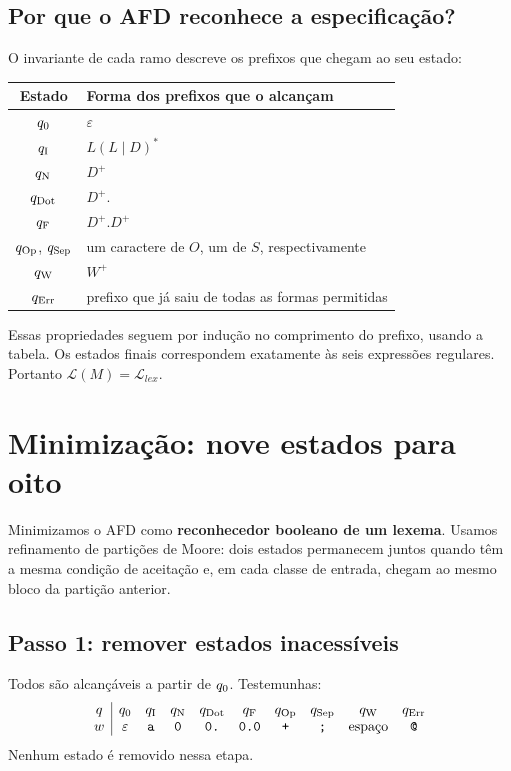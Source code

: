 \documentclass[12pt,a4paper]{article}
\begin{document}
\subsection{Por que o AFD reconhece a especificação?}
O invariante de cada ramo descreve os prefixos que chegam ao seu estado:
\begin{center}
\begin{tabular}{cl}
\toprule Estado & Forma dos prefixos que o alcançam\\\midrule
$q_{\mathrm{0}}$ & $\varepsilon$\\
$q_{\mathrm{I}}$ & $L(L\mid D)^*$\\
$q_{\mathrm{N}}$ & $D^+$\\
$q_{\mathrm{Dot}}$ & $D^+\texttt{.}$\\
$q_{\mathrm{F}}$ & $D^+\texttt{.}D^+$\\
$q_{\mathrm{Op}}$, $q_{\mathrm{Sep}}$ & um caractere de $O$, um de $S$, respectivamente\\
$q_{\mathrm{W}}$ & $W^+$\\
$q_{\mathrm{Err}}$ & prefixo que já saiu de todas as formas permitidas\\\bottomrule
\end{tabular}\end{center}
Essas propriedades seguem por indução no comprimento do prefixo, usando a
tabela. Os estados finais correspondem exatamente às seis expressões
regulares. Portanto $\mathcal{L}(M)=\mathcal{L}_{lex}$.

\section{Minimização: nove estados para oito}
Minimizamos o AFD como \textbf{reconhecedor booleano de um lexema}. Usamos
refinamento de partições de Moore: dois estados permanecem juntos quando têm
a mesma condição de aceitação e, em cada classe de entrada, chegam ao mesmo
bloco da partição anterior.

\subsection{Passo 1: remover estados inacessíveis}
Todos são alcançáveis a partir de $q_{\mathrm{0}}$. Testemunhas:
\[
\begin{array}{c|ccccccccc}
q&q_{\mathrm{0}}&q_{\mathrm{I}}&q_{\mathrm{N}}&q_{\mathrm{Dot}}&q_{\mathrm{F}}&q_{\mathrm{Op}}&q_{\mathrm{Sep}}&q_{\mathrm{W}}&q_{\mathrm{Err}}\\
w&\varepsilon&\texttt{a}&\texttt{0}&\texttt{0.}&\texttt{0.0}&\texttt{+}&\texttt{;}&\text{espaço}&\texttt{@}
\end{array}
\]
Nenhum estado é removido nessa etapa.
\end{document}
